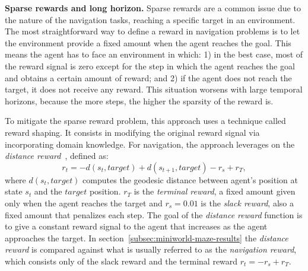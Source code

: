 \textbf{Sparse rewards and long horizon.}
Sparse rewards are a common issue due to the nature of the navigation tasks, \ie reaching a specific target in an environment.
The most straightforward way to define a reward in navigation problems is to let the environment provide a fixed amount when the agent reaches the goal.
This means the agent has to face an environment in which:
1) in the best case, most of the reward signal is zero except for the step in which the agent reaches the goal and obtains a certain amount of reward;
and 2) if the agent does not reach the target, it does not receive any reward.
This situation worsens with large temporal horizons, because the more steps, the higher the sparsity of the reward is.

To mitigate the sparse reward problem, this approach uses a technique called reward shaping.
It consists in modifying the original reward signal via incorporating domain knowledge.
For navigation, the approach leverages on the \textit{distance reward}~\cite{wijmans2020}, defined as:
\begin{equation}
    \label{eq:rew_shaping}
    r_t = -d(s_t, target) + d(s_{t+1}, target) - r_s + r_T,
\end{equation}
where $d(s_t, target)$ computes the geodesic distance between agent's position at state $s_t$ and the $target$ position.
$r_T$ is the \textit{terminal reward}, a fixed amount given only when the agent reaches the target and $r_s=0.01$ is the \textit{slack reward}, also a fixed amount that penalizes each step.
The goal of the \textit{distance reward} function is to give a constant reward signal to the agent that increases as the agent approaches the target.
In section~\ref{subsec:miniworld-maze-results} the \textit{distance reward} is compared against what is usually referred to as the \textit{navigation reward}, which consists only of the slack reward and the terminal reward $r_t = -r_s + r_T$.

